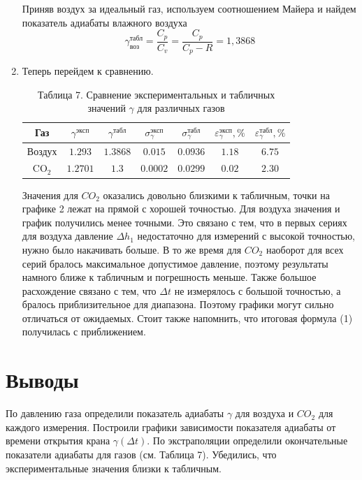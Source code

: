 \documentclass[a4paper]{article}
\begin{document}
\begin{enumerate}
Приняв воздух за идеальный газ, используем соотношением Майера и найдем показатель адиабаты влажного воздуха
\begin{equation*}
	\gamma_{\text{воз}}^{\text{табл}} = \frac{C_p}{C_v} = \frac{C_p}{C_p - R} = 1,3868
\end{equation*}
\item Теперь перейдем к сравнению.
\begin{table}[h!]
    \centering
    \begin{tabular}{|c|c|c|c|c|c|c|}
        \hline
        Газ & $\gamma^{\text{эксп}}$ & $\gamma^{\text{табл}}$ & $\sigma_{\gamma}^{\text{эксп}}$ & $\sigma_{\gamma}^{\text{табл}}$ & $\varepsilon_{\gamma}^{\text{эксп}}, \%$ & $\varepsilon_{\gamma}^{\text{табл}}, \%$ \\
        \hline
        Воздух & $1.293$ & $1.3868$ & $0.015$ & $0.0936$ & $1.18$ & $6.75$ \\ \hline
        CO$_2$ & $1.2701$ & $1.3$ & $0.0002$ & $0.0299$ & $0.02$ & $2.30$ \\ \hline
    \end{tabular}
    \caption{Таблица 7. Сравнение экспериментальных и табличных значений $\gamma$ для различных газов}
\end{table}
Значения для $CO_2$ оказались довольно близкими к табличным, точки на графике 2 лежат на прямой с хорошей точностью. Для воздуха значения и график получились менее точными. Это связано с тем, что в первых сериях для воздуха давление $\Delta h_1$ недостаточно для измерений с высокой точностью, нужно было накачивать больше. В то же время для $CO_2$ наоборот для всех серий бралось максимальное допустимое давление, поэтому результаты намного ближе к табличным и погрешность меньше. Также большое расхождение связано с тем, что $\Delta t$ не измерялось с большой точностью, а бралось приблизительное для диапазона. Поэтому графики могут сильно отличаться от ожидаемых. Стоит также напомнить, что итоговая формула (1) получилась с приближением.

\end{enumerate}





\section{Выводы}
По давлению газа определили показатель адиабаты $\gamma$ для воздуха и $CO_2$ для каждого измерения. Построили графики зависимости показателя адиабаты от времени открытия крана $\gamma(\Delta t)$. По экстраполяции определили окончательные показатели адиабаты для газов (см. Таблица 7). Убедились, что экспериментальные значения близки к табличным.
\end{document}
